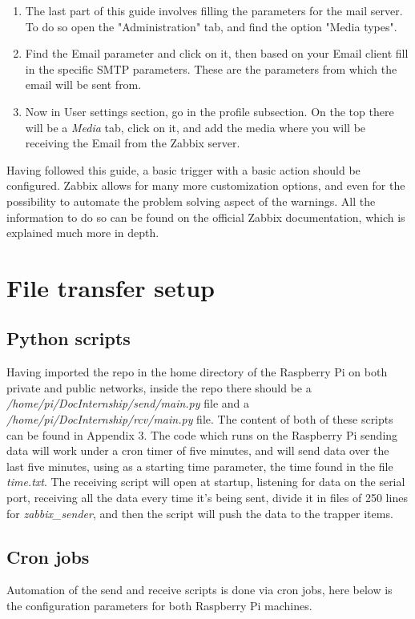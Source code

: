 \documentclass[a4paper,11pt]{scrartcl}
\begin{document}
\begin{enumerate}
    \item The last part of this guide involves filling the parameters for the mail server. To do so open the "Administration" tab, and find the option "Media types".
    \item Find the Email parameter and click on it, then based on your Email client fill in the specific SMTP parameters. These are the parameters from which the email will be sent from.
    \item Now in User settings section, go in the profile subsection. On the top there will be a \textit{Media} tab, click on it, and add the media where you will be receiving the Email from the Zabbix server.
\end{enumerate}
Having followed this guide, a basic trigger with a basic action should be configured. Zabbix allows for many more customization options, and even for the possibility to automate the problem solving aspect of the warnings. All the information to do so can be found on the official Zabbix documentation, which is explained much more in depth.

\section{File transfer setup}
\subsection{Python scripts}
Having imported the repo in the home directory of the Raspberry Pi on both private and public networks, inside the repo there should be a \textit{/home/pi/DocInternship/send/main.py} file and a \textit{/home/pi/DocInternship/rcv/main.py} file. The content of both of these scripts can be found in Appendix 3. The code which runs on the Raspberry Pi sending data will work under a cron timer of five minutes, and will send data over the last five minutes, using as a starting time parameter, the time found in the file \textit{time.txt}. The receiving script will open at startup, listening for data on the serial port, receiving all the data every time it's being sent, divide it in files of 250 lines for \textit{zabbix\_sender}, and then the script will push the data to the trapper items.  

\subsection{Cron jobs}
Automation of the send and receive scripts is done via cron jobs, here below is the configuration parameters for both Raspberry Pi machines.
\end{document}
